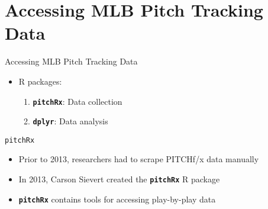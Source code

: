 \section{Accessing MLB Pitch Tracking
Data}\label{accessing-mlb-pitch-tracking-data}

\begin{frame}[fragile]{Accessing MLB Pitch Tracking Data}

\begin{itemize}

\item
  R packages:

  \begin{enumerate}
  \def\labelenumi{\arabic{enumi}.}
  
  \item
    \textbf{\texttt{pitchRx}}: Data collection
  \item
    \textbf{\texttt{dplyr}}: Data analysis
  \end{enumerate}
\end{itemize}

\end{frame}

\begin{frame}[fragile]{\texttt{pitchRx}}

\begin{itemize}

\item
  Prior to 2013, researchers had to scrape PITCHf/x data manually
\item
  In 2013, Carson Sievert created the \textbf{\texttt{pitchRx}} R
  package
\item
  \textbf{\texttt{pitchRx}} contains tools for accessing play-by-play
  data
\end{itemize}

\end{frame}

